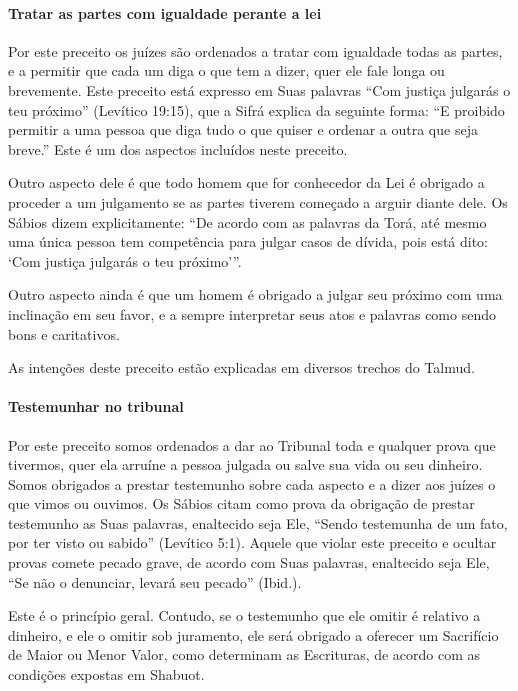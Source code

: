 \paragraph{Tratar as partes com igualdade perante a lei}

Por este preceito os juízes são ordenados a tratar com igualdade todas
as partes, e a permitir que cada um diga o que tem a dizer, quer ele
fale longa ou brevemente. Este preceito está expresso em Suas palavras
``Com justiça julgarás o teu próximo'' (Levítico 19:15), que a Sifrá
explica da seguinte forma: ``E proibido permitir a uma pessoa que diga
tudo o que quiser e ordenar a outra que seja breve.'' Este é um dos
aspectos incluídos neste preceito.

Outro aspecto dele é que todo homem que for conhecedor da Lei é obrigado
a proceder a um julgamento se as partes tiverem começado a arguir diante
dele. Os Sábios dizem explicitamente: ``De acordo com as palavras da
Torá, até mesmo uma única pessoa tem competência para julgar casos de
dívida, pois está dito: `Com justiça julgarás o teu próximo'''.

Outro aspecto ainda é que um homem é obrigado a julgar seu próximo com
uma inclinação em seu favor, e a sempre interpretar seus atos e
palavras como sendo bons e caritativos.

As intenções deste preceito estão explicadas em diversos trechos do
Talmud.

\paragraph{Testemunhar no tribunal}

Por este preceito somos ordenados a dar ao Tribunal toda e qualquer
prova que tivermos, quer ela arruíne a pessoa julgada ou salve sua vida
ou seu dinheiro. Somos obrigados a prestar testemunho sobre cada aspecto
e a dizer aos juízes o que vimos ou ouvimos. Os Sábios citam como prova
da obrigação de prestar testemunho as Suas palavras, enaltecido seja
Ele, ``Sendo testemunha de um fato, por ter visto ou sabido'' (Levítico
5:1). Aquele que violar este preceito e ocultar provas comete pecado
grave, de acordo com Suas palavras, enaltecido seja Ele, ``Se não o
denunciar, levará seu pecado'' (Ibid.).

Este é o princípio geral. Contudo, se o testemunho que ele omitir é
relativo a dinheiro, e ele o omitir sob juramento, ele será obrigado a
oferecer um Sacrifício de Maior ou Menor Valor, como determinam as
Escrituras, de acordo com as condições expostas em Shabuot.

